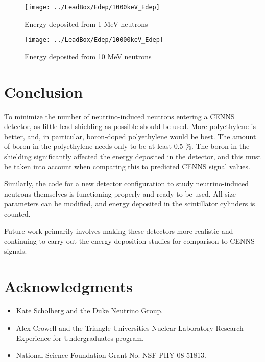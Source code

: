 \documentclass[12pt]{article}
\begin{document}
\begin{figure}[H]
  \centering
  \begin{minipage}[t]{0.45\linewidth}
    \texttt{[image: ../LeadBox/Edep/1000keV\_Edep]}
    \caption{Energy deposited from 1 MeV neutrons}
    \label{fig:1MeV}
  \end{minipage}
  \quad
  \begin{minipage}[t]{0.45\linewidth}
    \texttt{[image: ../LeadBox/Edep/10000keV\_Edep]}
    \caption{Energy deposited from 10 MeV neutrons}
    \label{fig:10MeV}
  \end{minipage}
\end{figure}

\section{Conclusion}
To minimize the number of neutrino-induced neutrons entering a CENNS detector, as little lead shielding as possible should be used. More polyethylene is better, and, in particular, boron-doped polyethylene would be best. The amount of boron in the polyethylene needs only to be at least 0.5 \%. The boron in the shielding significantly affected the energy deposited in the detector, and this must be taken into account when comparing this to predicted CENNS signal values.

Similarly, the code for a new detector configuration to study neutrino-induced neutrons themselves is functioning properly and ready to be used. All size parameters can be modified, and energy deposited in the scintillator cylinders is counted.

Future work primarily involves making these detectors more realistic and continuing to carry out the energy deposition studies for comparison to CENNS signals.

\section*{Acknowledgments}
\begin{itemize}
  \item[] Kate Scholberg and the Duke Neutrino Group.
  \item[] Alex Crowell and the Triangle Universities Nuclear Laboratory Research Experience for Undergraduates program.
  \item[] National Science Foundation Grant No. NSF-PHY-08-51813.
\end{itemize}



\end{document}

